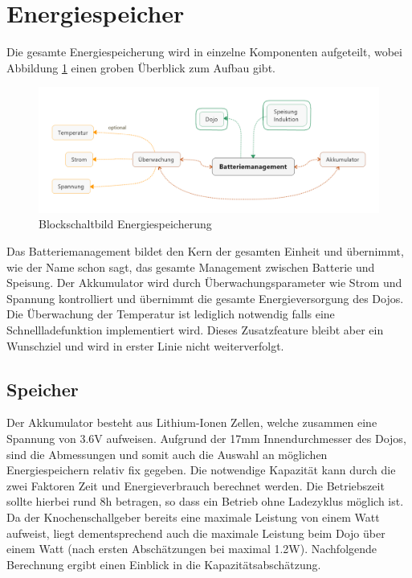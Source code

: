 \section{Energiespeicher}

Die gesamte Energiespeicherung wird in einzelne Komponenten aufgeteilt, wobei Abbildung \ref{fig:blockschaltbild} einen groben Überblick zum Aufbau gibt.

\begin{figure}[H]
	\begin{center}
		\includegraphics[width=160mm]{data/Batteriemanagement.png}
		\caption{Blockschaltbild Energiespeicherung} %
		\label{fig:blockschaltbild}
	\end{center}
\end{figure}

Das Batteriemanagement bildet den Kern der gesamten Einheit und übernimmt, wie der Name schon sagt, das gesamte Management zwischen Batterie und Speisung. Der Akkumulator wird durch Überwachungsparameter wie Strom und Spannung kontrolliert und übernimmt die gesamte Energieversorgung des Dojos. Die Überwachung der Temperatur ist lediglich notwendig falls eine Schnellladefunktion implementiert wird. Dieses Zusatzfeature bleibt aber ein Wunschziel und wird in erster Linie nicht weiterverfolgt.

\subsection{Speicher}
Der Akkumulator besteht aus Lithium-Ionen Zellen, welche zusammen eine Spannung von 3.6V aufweisen. Aufgrund der 17mm Innendurchmesser des Dojos, sind die Abmessungen und somit auch die Auswahl an möglichen Energiespeichern relativ fix gegeben. Die notwendige Kapazität kann durch die zwei Faktoren Zeit und Energieverbrauch berechnet werden. Die Betriebszeit sollte hierbei rund 8h betragen, so dass ein Betrieb ohne Ladezyklus möglich ist. Da der Knochenschallgeber bereits eine maximale Leistung von einem Watt aufweist, liegt dementsprechend auch die maximale Leistung beim Dojo über einem Watt (nach ersten Abschätzungen bei maximal 1.2W). Nachfolgende Berechnung ergibt einen Einblick in die Kapazitätsabschätzung.

